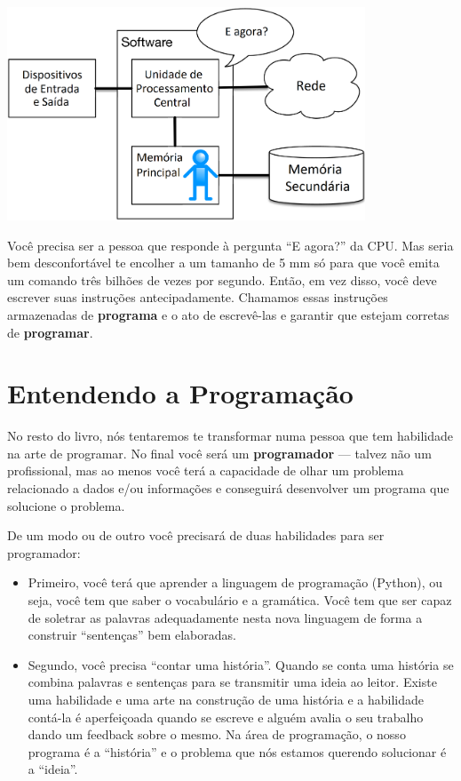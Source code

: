 \centerline{\includegraphics[height=2.50in]{imagens/arch2.png}}


Você precisa ser a pessoa que responde à pergunta ``E agora?'' da CPU.  Mas seria bem desconfortável te encolher a um tamanho de 5 mm só para que você emita um comando três bilhões de vezes por segundo.  Então, em vez disso, você deve escrever suas instruções antecipadamente.
Chamamos essas instruções armazenadas de  {\bf programa} e o ato de escrevê-las e garantir que estejam corretas de  {\bf programar}.
\section{Entendendo a Programação} %
No resto do livro, nós tentaremos te transformar numa pessoa que tem habilidade na arte de programar. No final você será um {\bf programador} --- talvez não um profissional, mas ao menos você terá a capacidade de olhar um problema relacionado a dados e/ou informações e conseguirá desenvolver um programa que solucione o problema.


De um modo ou de outro você precisará de duas habilidades para ser programador:

\begin{itemize}
    \item Primeiro, você terá que aprender a linguagem de programação (Python), ou seja, você tem que saber o vocabulário e a gramática. Você tem que ser capaz de soletrar as palavras adequadamente nesta nova linguagem de forma a construir ``sentenças'' bem elaboradas.
    
    \item Segundo, você precisa ``contar uma história''. Quando se conta uma história se combina palavras e sentenças para se transmitir uma ideia ao leitor. Existe uma habilidade e uma arte na construção de uma história e a habilidade contá-la é aperfeiçoada quando se escreve e alguém avalia o seu trabalho dando um feedback sobre o mesmo. Na área de  programação, o nosso programa é a ``história'' e o problema que nós estamos querendo solucionar é a ``ideia''.
\end{itemize}

